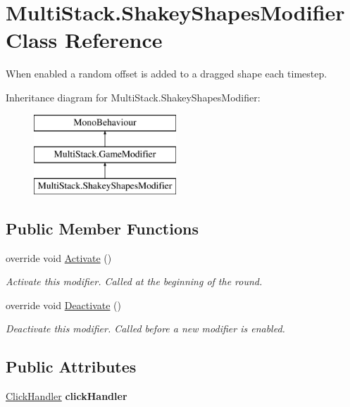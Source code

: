 \hypertarget{class_multi_stack_1_1_shakey_shapes_modifier}{}\section{Multi\+Stack.\+Shakey\+Shapes\+Modifier Class Reference}
\label{class_multi_stack_1_1_shakey_shapes_modifier}


When enabled a random offset is added to a dragged shape each timestep.  


Inheritance diagram for Multi\+Stack.\+Shakey\+Shapes\+Modifier\+:\begin{figure}[H]
\begin{center}
\leavevmode
\includegraphics[height=3.000000cm]{class_multi_stack_1_1_shakey_shapes_modifier}
\end{center}
\end{figure}
\subsection*{Public Member Functions}
\begin{DoxyCompactItemize}
\item 
override void \hyperlink{class_multi_stack_1_1_shakey_shapes_modifier_ae45e7bdf85d9655ef28b5a33e0ae72e6}{Activate} ()
\begin{DoxyCompactList}\small\item\em Activate this modifier. Called at the beginning of the round. \end{DoxyCompactList}\item 
override void \hyperlink{class_multi_stack_1_1_shakey_shapes_modifier_a10f32463b2e5e38d7b50698232e145b4}{Deactivate} ()
\begin{DoxyCompactList}\small\item\em Deactivate this modifier. Called before a new modifier is enabled. \end{DoxyCompactList}\end{DoxyCompactItemize}
\subsection*{Public Attributes}
\begin{DoxyCompactItemize}
\item 
\hypertarget{class_multi_stack_1_1_shakey_shapes_modifier_a691fc53b2d5c01ae6ca303480ea4c1ff}{}\hyperlink{class_multi_stack_1_1_click_handler}{Click\+Handler} {\bfseries click\+Handler}\label{class_multi_stack_1_1_shakey_shapes_modifier_a691fc53b2d5c01ae6ca303480ea4c1ff}

\end{DoxyCompactItemize}



